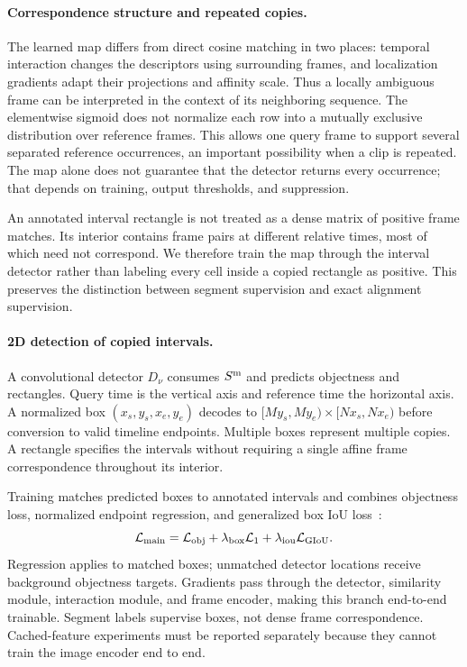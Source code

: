 \paragraph{Correspondence structure and repeated copies.}
The learned map differs from direct cosine matching in two places: temporal interaction
changes the descriptors using surrounding frames, and localization gradients adapt their
projections and affinity scale. Thus a locally ambiguous frame can be interpreted in the
context of its neighboring sequence. The elementwise sigmoid does not normalize each row
into a mutually exclusive distribution over reference frames. This allows one query frame
to support several separated reference occurrences, an important possibility when a clip
is repeated. The map alone does not guarantee that the detector returns every occurrence;
that depends on training, output thresholds, and suppression.

An annotated interval rectangle is not treated as a dense matrix of positive frame matches.
Its interior contains frame pairs at different relative times, most of which need not
correspond. We therefore train the map through the interval detector rather than labeling
every cell inside a copied rectangle as positive. This preserves the distinction between
segment supervision and exact alignment supervision.

\paragraph{2D detection of copied intervals.}
A convolutional detector $D_\nu$ consumes $S^{\rm m}$ and predicts objectness and rectangles.
Query time is the vertical axis and reference time the horizontal axis. A normalized box
$(x_s,y_s,x_e,y_e)$ decodes to $[My_s,My_e)\times[Nx_s,Nx_e)$ before conversion to valid
timeline endpoints. Multiple boxes represent multiple copies. A rectangle specifies the
intervals without requiring a single affine frame correspondence throughout its interior.

Training matches predicted boxes to annotated intervals and combines objectness loss,
normalized endpoint regression, and generalized box IoU loss~\cite{rezatofighi2019giou}:
\begin{equation}
\mathcal L_{\rm main}=\mathcal L_{\rm obj}
+\lambda_{\rm box}\mathcal L_1+\lambda_{\rm iou}\mathcal L_{\rm GIoU}.
\label{eq:main-loss}
\end{equation}
Regression applies to matched boxes; unmatched detector locations receive background
objectness targets. Gradients pass through the detector, similarity module, interaction module,
and frame encoder, making this branch end-to-end trainable. Segment labels supervise boxes,
not dense frame correspondence. Cached-feature experiments must be reported separately
because they cannot train the image encoder end to end.

